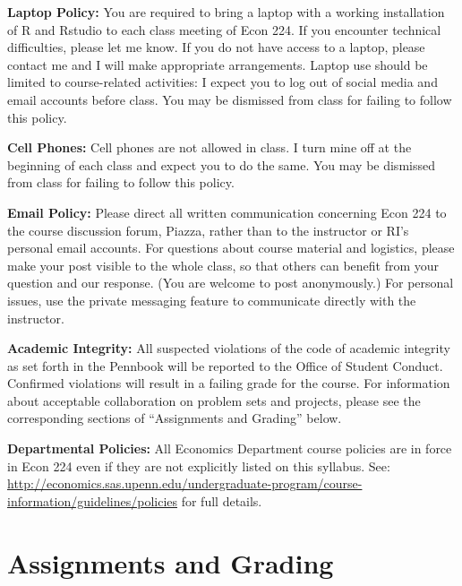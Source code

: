 \documentclass[11pt, letterpaper]{article}
\begin{document}
\medskip

\noindent \textbf{Laptop Policy:} You are required to bring a laptop with a working installation of R and Rstudio to each class meeting of Econ 224.
If you encounter technical difficulties, please let me know.
If you do not have access to a laptop, please contact me and I will make appropriate arrangements.
Laptop use should be limited to course-related activities: I expect you to log out of social media and email accounts before class.
You may be dismissed from class for failing to follow this policy.

\medskip

\noindent \textbf{Cell Phones:} Cell phones are not allowed in class. 
I turn mine off at the beginning of each class and expect you to do the same.
You may be dismissed from class for failing to follow this policy.

\medskip

\noindent \textbf{Email Policy:}
Please direct all written communication concerning Econ 224 to the course discussion forum, Piazza, rather than to the instructor or RI's personal email accounts.
For questions about course material and logistics, please make your post visible to the whole class, so that others can benefit from your question and our response.
(You are welcome to post anonymously.)
For personal issues, use the private messaging feature to communicate directly with the instructor. 

\medskip

\noindent \textbf{Academic Integrity:} 
All suspected violations of the code of academic integrity as set forth in the Pennbook will be reported to the Office of Student Conduct. 
Confirmed violations will result in a failing grade for the course. 
For information about acceptable collaboration on problem sets and projects, please see the corresponding sections of ``Assignments and Grading'' below.

\medskip

\noindent \textbf{Departmental Policies: } 
All Economics Department course policies are in force in Econ 224 even if they are not explicitly listed on this syllabus. 
See: \url{http://economics.sas.upenn.edu/undergraduate-program/course-information/guidelines/policies} for full details. 

\medskip



\newpage

\section*{Assignments and Grading}
\end{document}
